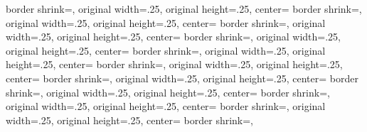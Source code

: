 {  {%
  border shrink=\pgfpageoptionborder,%
  original width=.25\pgfpageoptionheight,%
  original height=.25\pgfpageoptionwidth,%
  center=\pgfpoint{.75\pgfphysicalwidth}{.75\pgfphysicalheight}%
  }%
  {%
  border shrink=\pgfpageoptionborder,%
  original width=.25\pgfpageoptionheight,%
  original height=.25\pgfpageoptionwidth,%
  center=\pgfpoint{0\pgfphysicalwidth}{.5\pgfphysicalheight}%
  }%
  {%
  border shrink=\pgfpageoptionborder,%
  original width=.25\pgfpageoptionheight,%
  original height=.25\pgfpageoptionwidth,%
  center=\pgfpoint{.25\pgfphysicalwidth}{.5\pgfphysicalheight}%
  }%
  {%
  border shrink=\pgfpageoptionborder,%
  original width=.25\pgfpageoptionheight,%
  original height=.25\pgfpageoptionwidth,%
  center=\pgfpoint{.5\pgfphysicalwidth}{.5\pgfphysicalheight}%
  }%
  {%
  border shrink=\pgfpageoptionborder,%
  original width=.25\pgfpageoptionheight,%
  original height=.25\pgfpageoptionwidth,%
  center=\pgfpoint{.75\pgfphysicalwidth}{.5\pgfphysicalheight}%
  }%
  {%
  border shrink=\pgfpageoptionborder,%
  original width=.25\pgfpageoptionheight,%
  original height=.25\pgfpageoptionwidth,%
  center=\pgfpoint{0\pgfphysicalwidth}{.25\pgfphysicalheight}%
  }%
  {%
  border shrink=\pgfpageoptionborder,%
  original width=.25\pgfpageoptionheight,%
  original height=.25\pgfpageoptionwidth,%
  center=\pgfpoint{.25\pgfphysicalwidth}{.25\pgfphysicalheight}%
  }%
  {%
  border shrink=\pgfpageoptionborder,%
  original width=.25\pgfpageoptionheight,%
  original height=.25\pgfpageoptionwidth,%
  center=\pgfpoint{.5\pgfphysicalwidth}{.25\pgfphysicalheight}%
  }%
  {%
  border shrink=\pgfpageoptionborder,%
  original width=.25\pgfpageoptionheight,%
  original height=.25\pgfpageoptionwidth,%
  center=\pgfpoint{.75\pgfphysicalwidth}{.25\pgfphysicalheight}%
  }%
%
%
  {%
	border shrink=\pgfpageoptionborder,%
	original width=.25\pgfpageoptionheight,%
	original height=.25\pgfpageoptionwidth,%
	center=\pgfpoint{.75\pgfphysicalwidth}{\pgfphysicalheight}%
  }%
  {%
	border shrink=\pgfpageoptionborder,%
}}
